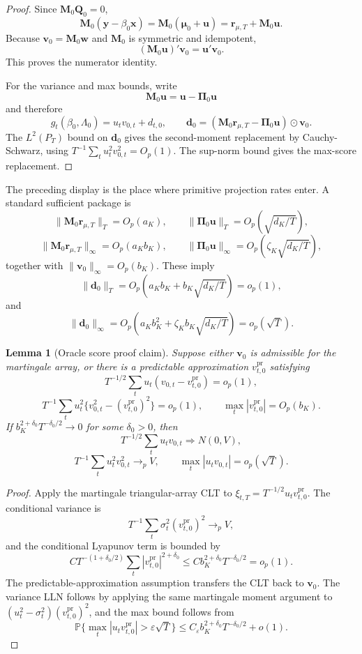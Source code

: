 \documentclass[12pt]{article}
\numberwithin{equation}{section}
\newtheorem{lemma}{Lemma}
\theoremstyle{definition}
\newcommand{\Pp}{\mathbb P}
\newcommand{\op}{o_p}
\newcommand{\Op}{O_p}
\begin{document}
\begin{proof}
Since \(\bm M_0\bm Q_0=0\),
\[
    \bm M_0(\bm y-\beta_0\bm x)
    =\bm M_0(\bm\mu_0+\bm u)
    =\bm r_{\mu,T}+\bm M_0\bm u.
\]
Because \(\bm v_0=\bm M_0\bm w\) and \(\bm M_0\) is symmetric and idempotent,
\[
    (\bm M_0\bm u)'\bm v_0=\bm u'\bm v_0.
\]
This proves the numerator identity.

For the variance and max bounds, write
\[
    \bm M_0\bm u=\bm u-\bm\Pi_0\bm u
\]
and therefore
\[
    g_t(\beta_0,\Lambda_0)
    =u_tv_{0,t}+d_{t,0},
    \qquad
    \bm d_0=(\bm M_0\bm r_{\mu,T}-\bm\Pi_0\bm u)\odot\bm v_0.
\]
The \(L^2(P_T)\) bound on \(\bm d_0\) gives the second-moment replacement by
Cauchy-Schwarz, using \(T^{-1}\sum_tu_t^2v_{0,t}^2=\Op(1)\). The sup-norm
bound gives the max-score replacement.
\end{proof}

The preceding display is the place where primitive projection rates enter. A
standard sufficient package is
\[
    \|\bm M_0\bm r_{\mu,T}\|_T=\Op(a_K),\qquad
    \|\bm\Pi_0\bm u\|_T=\Op\!\left(\sqrt{d_K/T}\right),
\]
\[
    \|\bm M_0\bm r_{\mu,T}\|_\infty=\Op(a_Kb_K),\qquad
    \|\bm\Pi_0\bm u\|_\infty
    =\Op\!\left(\zeta_K\sqrt{d_K/T}\right),
\]
together with \(\|\bm v_0\|_\infty=\Op(b_K)\). These imply
\[
    \|\bm d_0\|_T
    =\Op\!\left(a_Kb_K+b_K\sqrt{d_K/T}\right)=\op(1),
\]
and
\[
    \|\bm d_0\|_\infty
    =\Op\!\left(a_Kb_K^2+\zeta_Kb_K\sqrt{d_K/T}\right)=\op(\sqrt T).
\]

\begin{lemma}[Oracle score proof claim]
\label{lem:part2-oracle-score-proof-claim}
Suppose either \(\bm v_0\) is admissible for the martingale array, or there is a
predictable approximation \(v_{t,0}^{\mathrm{pr}}\) satisfying
\[
    T^{-1/2}\sum_t u_t(v_{0,t}-v_{t,0}^{\mathrm{pr}})=\op(1),
\]
\[
    T^{-1}\sum_t u_t^2\{v_{0,t}^2-(v_{t,0}^{\mathrm{pr}})^2\}=\op(1),
    \qquad
    \max_t|v_{t,0}^{\mathrm{pr}}|=\Op(b_K).
\]
If \(b_K^{2+\delta_0}T^{-\delta_0/2}\to0\) for some
\(\delta_0>0\), then
\[
    T^{-1/2}\sum_tu_tv_{0,t}\Rightarrow N(0,V),
\]
\[
    T^{-1}\sum_tu_t^2v_{0,t}^2\to_p V,
    \qquad
    \max_t|u_tv_{0,t}|=\op(\sqrt T).
\]
\end{lemma}

\begin{proof}
Apply the martingale triangular-array CLT to
\(\xi_{t,T}=T^{-1/2}u_tv_{t,0}^{\mathrm{pr}}\). The conditional variance is
\[
    T^{-1}\sum_t\sigma_t^2(v_{t,0}^{\mathrm{pr}})^2\to_p V,
\]
and the conditional Lyapunov term is bounded by
\[
    CT^{-(1+\delta_0/2)}
    \sum_t|v_{t,0}^{\mathrm{pr}}|^{2+\delta_0}
    \le Cb_K^{2+\delta_0}T^{-\delta_0/2}=\op(1).
\]
The predictable-approximation assumption transfers the CLT back to \(\bm v_0\).
The variance LLN follows by applying the same martingale moment argument to
\((u_t^2-\sigma_t^2)(v_{t,0}^{\mathrm{pr}})^2\), and the max bound follows from
\[
    \Pp\{\max_t|u_tv_{t,0}^{\mathrm{pr}}|>\varepsilon\sqrt T\}
    \le C_\varepsilon b_K^{2+\delta_0}T^{-\delta_0/2}+o(1).
\]
\end{proof}
\end{document}
